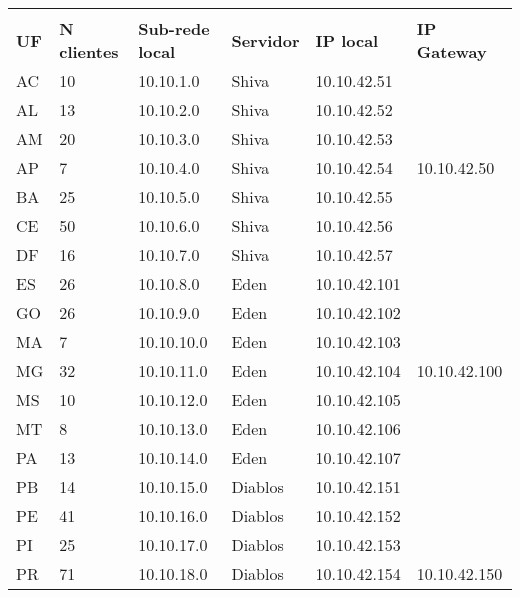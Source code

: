\begin{table}[h]
    \centering
    \begin{tabular}{llllll}
        \rowcolor[HTML]{000000} 
        \multicolumn{6}{c}{\cellcolor[HTML]{000000}{\color[HTML]{C0C0C0} 
            \textbf{Associação de Servidores à simulação da rede IPÊ}}} \\
        \rowcolor[HTML]{000000} 
        {\color[HTML]{9B9B9B} \textbf{UF}} & {\color[HTML]{9B9B9B} 
            \textbf{N clientes}} & {\color[HTML]{9B9B9B} 
            \textbf{Sub-rede local}} & {\color[HTML]{9B9B9B} 
            \textbf{Servidor}} & {\color[HTML]{9B9B9B} \textbf{IP local}} & 
            {\color[HTML]{9B9B9B} \textbf{IP Gateway}} \\
        AC &  10 &  10.10.1.0 &   Shiva  &  10.10.42.51 & \\ 
        AL  & 13 &  10.10.2.0  &  Shiva  &  10.10.42.52 & \\ 
        AM  & 20 &  10.10.3.0 &   Shiva  &  10.10.42.53 & \\
        AP  & 7  &  10.10.4.0 &   Shiva  &  10.10.42.54 & 10.10.42.50 \\
        BA  & 25 &  10.10.5.0 &   Shiva  &  10.10.42.55 & \\
        CE  & 50  & 10.10.6.0  &  Shiva  &  10.10.42.56 & \\
        DF  & 16 &  10.10.7.0  &  Shiva  &  10.10.42.57 & \\ \hline
        ES  & 26  & 10.10.8.0  &  Eden  &   10.10.42.101 & \\
        GO  & 26  & 10.10.9.0  &  Eden  &   10.10.42.102  & \\  
        MA  & 7  &  10.10.10.0 &  Eden  &   10.10.42.103  & \\  
        MG  & 32  & 10.10.11.0  & Eden  &   10.10.42.104  & 10.10.42.100 \\  
        MS  & 10  & 10.10.12.0  & Eden  &   10.10.42.105  & \\  
        MT  & 8   & 10.10.13.0  & Eden  &   10.10.42.106  & \\  
        PA  & 13  & 10.10.14.0  & Eden  &   10.10.42.107  & \\ \hline
        PB  & 14  & 10.10.15.0  & Diablos & 10.10.42.151  & \\
        PE  & 41  & 10.10.16.0  & Diablos & 10.10.42.152  & \\  
        PI &  25 &  10.10.17.0 &  Diablos & 10.10.42.153  & \\  
        PR &  71 &  10.10.18.0 &  Diablos & 10.10.42.154  & 10.10.42.150 \\

\end{tabular}
\end{table}
